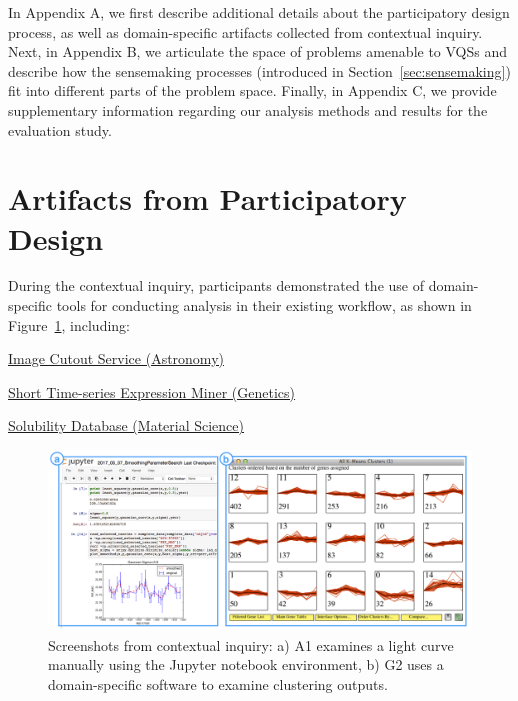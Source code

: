  \appendix
 \npar In Appendix A, we first describe additional details about the participatory design process, as well as domain-specific artifacts collected from contextual inquiry. Next, in Appendix B, we articulate the space of problems amenable to VQSs and describe how the sensemaking processes (introduced in Section~\ref{sec:sensemaking}) fit into different parts of the problem space. Finally, in Appendix C, we provide supplementary information regarding our analysis methods and results for the evaluation study.
 \section{Artifacts from Participatory Design\label{apdx:pdartifact}}
 \npar During the contextual inquiry, participants demonstrated the use of domain-specific tools for conducting analysis in their existing workflow, as shown in Figure~\ref{workflow}, including:
   \begin{denselist}
     \item \href{http://descut.cosmology.illinois.edu}{Image Cutout Service (Astronomy)}
     \item \href{http://cs.cmu.edu/~jernst/stem/}{Short Time-series Expression Miner (Genetics)}
     \item \href{http://srdata.nist.gov/solubility/}{Solubility Database (Material Science)}
   \end{denselist}
 \begin{figure}[h!]
   \centering
   \includegraphics[width=0.9\linewidth]{figures/workflow.png}
   \caption{Screenshots from contextual inquiry: a) A1 examines a light curve manually using the Jupyter notebook environment, b) G2 uses a domain-specific software to examine clustering outputs.}
   \label{workflow}
 \end{figure}
